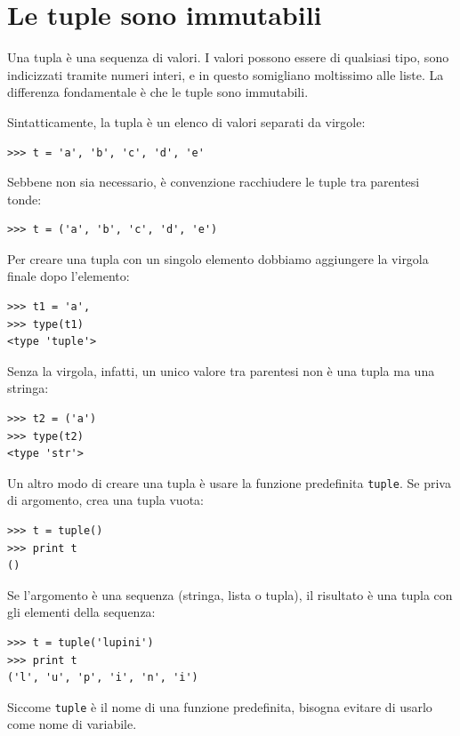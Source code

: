 \documentclass[10pt]{book}
\begin{document}
\section{Le tuple sono immutabili}

Una tupla è una sequenza di valori. I valori possono essere di qualsiasi tipo, sono indicizzati tramite numeri interi, e in questo somigliano moltissimo alle liste. La differenza fondamentale è che le tuple sono immutabili.

Sintatticamente, la tupla è un elenco di valori separati da virgole:

\begin{verbatim}
>>> t = 'a', 'b', 'c', 'd', 'e'
\end{verbatim}
%
Sebbene non sia necessario, è convenzione racchiudere le tuple tra
   parentesi tonde:

\begin{verbatim}
>>> t = ('a', 'b', 'c', 'd', 'e')
\end{verbatim}
%
Per creare una tupla con un singolo elemento dobbiamo aggiungere la
   virgola finale dopo l'elemento:

\begin{verbatim}
>>> t1 = 'a',
>>> type(t1)
<type 'tuple'>
\end{verbatim}
%
Senza la virgola, infatti, un unico valore tra parentesi non è una tupla ma una stringa:

\begin{verbatim}
>>> t2 = ('a')
>>> type(t2)
<type 'str'>
\end{verbatim}
%
Un altro modo di creare una tupla è usare la funzione predefinita {\tt tuple}.
Se priva di argomento, crea una tupla vuota:

\begin{verbatim}
>>> t = tuple()
>>> print t
()
\end{verbatim}
%
Se l'argomento è una sequenza (stringa, lista o tupla), il risultato è una tupla con gli elementi della sequenza:

\begin{verbatim}
>>> t = tuple('lupini')
>>> print t
('l', 'u', 'p', 'i', 'n', 'i')
\end{verbatim}
%
Siccome {\tt tuple} è il nome di una funzione predefinita, bisogna evitare di usarlo come nome di variabile.
\end{document}
